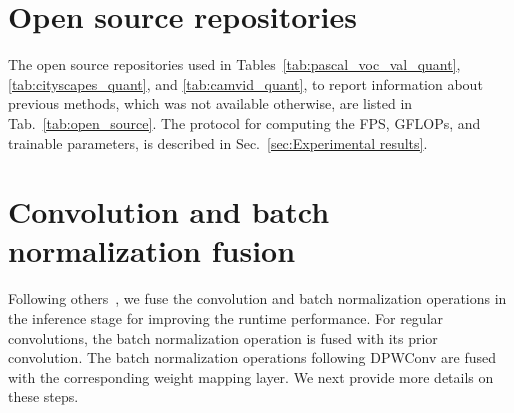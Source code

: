 \documentclass[final]{cvpr}
\begin{document}
\section{Open source repositories}
\label{sec:Open source repositories}
The open source repositories used in Tables~\ref{tab:pascal_voc_val_quant}, \ref{tab:cityscapes_quant}, and \ref{tab:camvid_quant}, to report information about previous methods, which was not available otherwise, are listed in Tab.~\ref{tab:open_source}. The protocol for computing the FPS, GFLOPs, and trainable parameters, is described in Sec.~\ref{sec:Experimental results}.



\begin{table*}[t!]
\caption{\emph{List of open source repositories used for comparing to previous methods.} }
\label{tab:open_source}
\end{table*}

\section{Convolution and batch normalization fusion}
\label{sec:Batch normalization fusion}
Following others~\cite{orsic2019defense}, we fuse the convolution and batch normalization operations in the inference stage for improving the runtime performance. For regular convolutions, the batch normalization operation is fused with its prior convolution. The batch normalization operations following DPWConv are fused with the corresponding weight mapping layer. We next provide more details on these steps.
\end{document}
